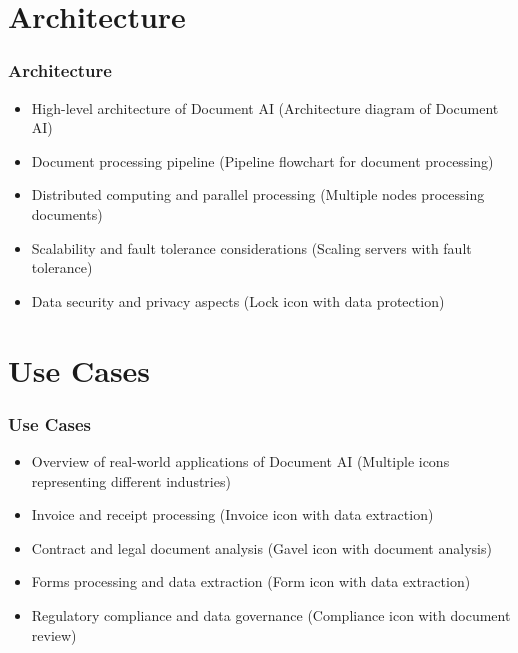 \section{Architecture}

\begin{frame}[fragile]\frametitle{Architecture}
  \begin{itemize}
    \item High-level architecture of Document AI (Architecture diagram of Document AI)
    \item Document processing pipeline (Pipeline flowchart for document processing)
    \item Distributed computing and parallel processing (Multiple nodes processing documents)
    \item Scalability and fault tolerance considerations (Scaling servers with fault tolerance)
    \item Data security and privacy aspects (Lock icon with data protection)
  \end{itemize}
\end{frame}

\section{Use Cases}

\begin{frame}[fragile]\frametitle{Use Cases}
  \begin{itemize}
    \item Overview of real-world applications of Document AI (Multiple icons representing different industries)
    \item Invoice and receipt processing (Invoice icon with data extraction)
    \item Contract and legal document analysis (Gavel icon with document analysis)
    \item Forms processing and data extraction (Form icon with data extraction)
    \item Regulatory compliance and data governance (Compliance icon with document review)
  \end{itemize}
\end{frame}

